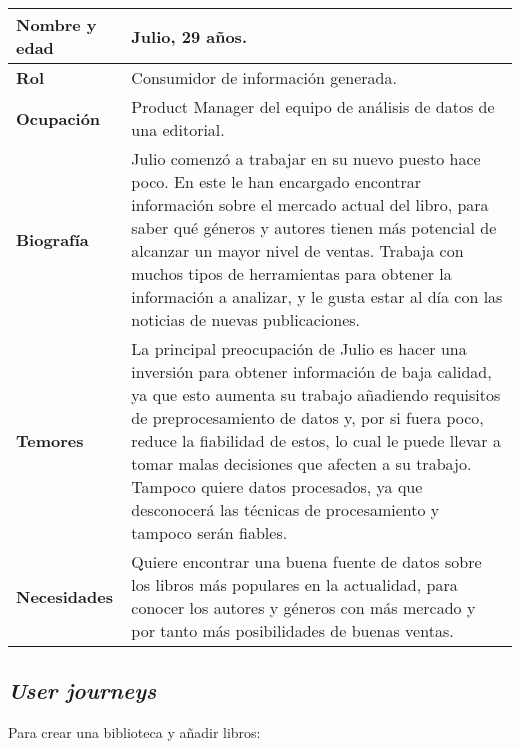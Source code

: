 \begin{table}[H]
    \centering
    \begin{tabularx}{\columnwidth}{|l|X|}
        \hline
        \textbf{Nombre y edad} & Julio, 29 años. \\
        \hline
        \textbf{Rol} & Consumidor de información generada. \\
        \hline
        \textbf{Ocupación} & Product Manager del equipo de análisis de datos de una editorial. \\
        \hline
        \textbf{Biografía} & Julio comenzó a trabajar en su nuevo puesto hace poco. En este le han encargado encontrar información sobre el mercado actual del libro, para saber qué géneros y autores tienen más potencial de alcanzar un mayor nivel de ventas. Trabaja con muchos tipos de herramientas para obtener la información a analizar, y le gusta estar al día con las noticias de nuevas publicaciones. \\
        \hline
        \textbf{Temores} & La principal preocupación de Julio es hacer una inversión para obtener información de baja calidad, ya que esto aumenta su trabajo añadiendo requisitos de preprocesamiento de datos y, por si fuera poco, reduce la fiabilidad de estos, lo cual le puede llevar a tomar malas decisiones que afecten a su trabajo. Tampoco quiere datos procesados, ya que desconocerá las técnicas de procesamiento y tampoco serán fiables. \\
        \hline
        \textbf{Necesidades} & Quiere encontrar una buena fuente de datos sobre los libros más populares en la actualidad, para conocer los autores y géneros con más mercado y por tanto más posibilidades de buenas ventas. \\
        \hline
    \end{tabularx}
\end{table}

\subsection{\textit{User journeys}}

Para crear una biblioteca y añadir libros:

